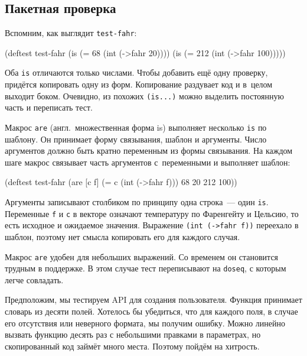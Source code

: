\fi

\subsection{Пакетная проверка}

Вспомним, как выглядит \verb|test-fahr|:

\begin{english}
  \begin{clojure}
(deftest test-fahr
  (is (= 68 (int (->fahr 20))))
  (is (= 212 (int (->fahr 100)))))
  \end{clojure}
\end{english}

Оба \verb|is| отличаются только числами. Чтобы добавить ещё одну проверку,
придётся копировать одну из форм. Копирование раздувает код и в~целом выходит
боком. Очевидно, из похожих \verb|(is...)| можно выделить постоянную часть и
переписать тест.


Макрос \verb|are| (англ.~множественная форма is) выполняет несколько
\verb|is| по шаблону. Он принимает форму связывания, шаблон и аргументы. Число
аргументов должно быть кратно переменным из формы связывания. На каждом шаге
макрос связывает часть аргументов с~переменными и выполняет шаблон:

\begin{english}
  \begin{clojure}
(deftest test-fahr
  (are [c f] (= c (int (->fahr f)))
    68 20
    212 100))
  \end{clojure}
\end{english}

Аргументы записывают столбиком по принципу одна строка~--- один
\verb|is|. Переменные \verb|f| и \verb|c| в векторе означают температуру по
Фаренгейту и Цельсию, то есть исходное и ожидаемое значения. Выражение
\verb|(int (->fahr f))| переехало в шаблон, поэтому нет смысла копировать его
для каждого случая.

Макрос \verb|are| удобен для небольших выражений. Со временем он становится
трудным в поддержке. В этом случае тест переписывают на \verb|doseq|, с которым
легче совладать.

Предположим, мы тестируем API для создания пользователя. Функция принимает
словарь из десяти полей. Хотелось бы убедиться, что для каждого поля, в случае
его отсутствия или неверного формата, мы получим ошибку. Можно линейно вызвать
функцию десять раз с небольшими правками в параметрах, но скопированный код
займёт много места. Поэтому пойдём на хитрость.

